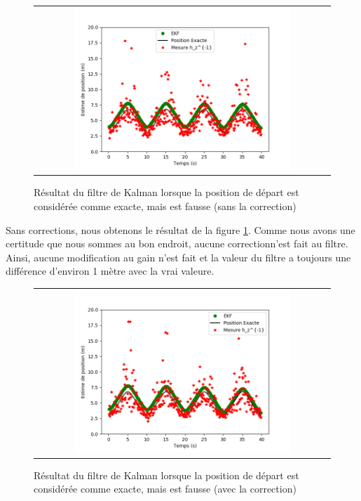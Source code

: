 \documentclass[12pt]{article}
\begin{document}
\begin{figure}[ht]
 \begin{center}
  \begin{tabular}{c}
    \includegraphics[width=0.75\textwidth]{fig/kalman-position-err-certitude-pas-correction.png}
  \end{tabular}
 \end{center}
\vspace{-0.25in}
    \caption{Résultat du filtre de Kalman lorsque la position de départ est considérée comme exacte, mais est fausse (sans la correction)}
    \label{kalman-position-err-certitude-pas-correction}
\end{figure}

Sans corrections, nous obtenons le résultat de la figure \ref{kalman-position-err-certitude-pas-correction}.
Comme nous avons une certitude que nous sommes au bon endroit, aucune correctionn'est fait au filtre.
Ainsi, aucune modification au gain n'est fait et la valeur du filtre a toujours une différence d'environ 1 mètre avec la vrai valeure.

\begin{figure}[ht]
 \begin{center}
  \begin{tabular}{c}
    \includegraphics[width=0.75\textwidth]{fig/kalman-position-err-certitude-correction.png}
  \end{tabular}
 \end{center}
\vspace{-0.25in}
    \caption{Résultat du filtre de Kalman lorsque la position de départ est considérée comme exacte, mais est fausse (avec la correction)}
    \label{kalman-position-err-certitude-correction}
\end{figure}
\end{document}
